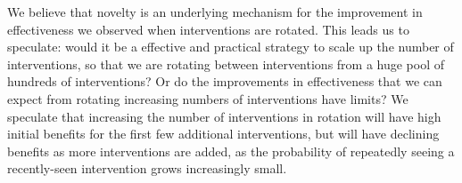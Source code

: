 We believe that novelty is an underlying mechanism for the improvement in effectiveness we observed when interventions are rotated. This leads us to speculate: would it be a effective and practical strategy to scale up the number of interventions, so that we are rotating between interventions from a huge pool of hundreds of interventions? Or do the improvements in effectiveness that we can expect from rotating increasing numbers of interventions have limits? We speculate that increasing the number of interventions in rotation will have high initial benefits for the first few additional interventions, but will have declining benefits as more interventions are added, as the probability of repeatedly seeing a recently-seen intervention grows increasingly small.





